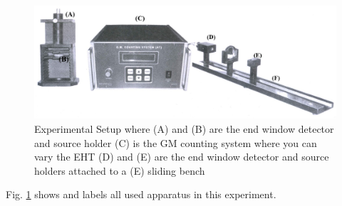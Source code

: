 \begin{figure}
    \centering
    \includegraphics[width=1\columnwidth]{images/t2.jpg}
    \caption{Experimental Setup where (A) and (B) are the end window detector and source holder (C) is the GM counting system where you can vary the EHT (D) and (E) are the end window detector and source holders attached to a (E) sliding bench}
    \label{t3}
\end{figure}
\noindent Fig. \ref{t3} shows and labels all used apparatus in this experiment.